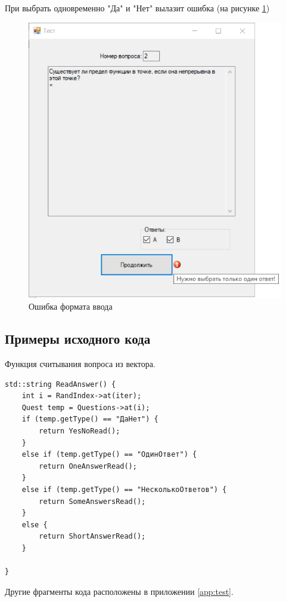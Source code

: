 При выбрать одновременно "Да" и "Нет" вылазит ошибка (на рисунке \ref{task9_launch3})
\begin{figure}[H]
    \centering
    \includegraphics[width=0.8\linewidth]{lections/img/task9_launch3.png}
    \caption{Ошибка формата ввода}
    \label{task9_launch3}
\end{figure}

\subsection{Примеры исходного кода}


Функция считывания вопроса из вектора.
\begin{verbatim}
std::string ReadAnswer() {
	int i = RandIndex->at(iter);
	Quest temp = Questions->at(i);
	if (temp.getType() == "ДаНет") {
		return YesNoRead();
	}
	else if (temp.getType() == "ОдинОтвет") {
		return OneAnswerRead();
	}
	else if (temp.getType() == "НесколькоОтветов") {
		return SomeAnswersRead();
	}
	else {
		return ShortAnswerRead();
	}

}
\end{verbatim}
Другие фрагменты кода расположены в приложении \ref{app:test}.
\sectionbreak